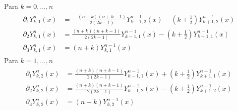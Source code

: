 \begin{prop} Para $k=0,...,n$
	\begin{gather*} 
		\begin{aligned}
			\partial_1Y^{n}_{k,1}(x) &= -\frac{(n+k)(n+k-1)}{2(2k-1)}Y^{n-1}_{k-1,2}(x)-(k+\frac{1}{2})Y^{n-1}_ {k+1,2}(x) \\
		\partial_2Y^{n}_{k,1}(x) &= \frac{(n+k)(n+k-1)}{2(2k-1)}Y^{n-1}_{k-1,1}(x)-(k+\frac{1}{2})Y^{n-1}_ {k+1,1}(x) \\
		\partial_3 Y_{k,1}^{n}(x) &=(n+k)Y_{k,1}^{n-1}(x)
			\end{aligned}
	\end{gather*}
 Para $k=1,...,n$
	\begin{gather*}
	\begin{aligned}
	\partial_1Y^{n}_{k,2}(x) &= \frac{(n+k)(n+k-1)}{2(2k-1)}Y^{n-1}_{k-1,1}(x)+(k+\frac{1}{2})Y^{n-1}_ {k+1,1}(x)\\
	\partial_2Y^{n}_{k,2}(x) &= \frac{(n+k)(n+k-1)}{2(2k-1)}Y^{n-1}_{k-1,2}(x)-(k+\frac{1}{2})Y^{n-1}_ {k+1,2}(x)\\
	\partial_3 Y_{k,2}^{n}(x) &=(n+k)Y_{k,2}^{n-1}(x)
		\end{aligned}
	\end{gather*}

	
\end{prop}